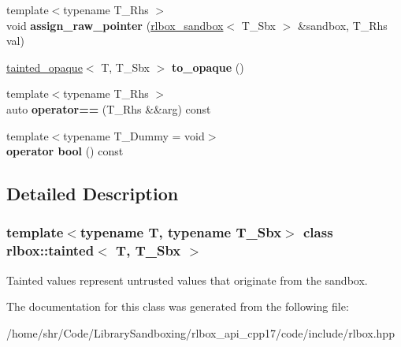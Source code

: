 \begin{DoxyCompactItemize}
\item 
\mbox{\label{classrlbox_1_1tainted_a27a59dcab0ce6e4aa69be370ce5543fc}} 
{\footnotesize template$<$typename T\+\_\+\+Rhs $>$ }\\void {\bfseries assign\+\_\+raw\+\_\+pointer} (\hyperlink{classrlbox_1_1rlbox__sandbox}{rlbox\+\_\+sandbox}$<$ T\+\_\+\+Sbx $>$ \&sandbox, T\+\_\+\+Rhs val)
\item 
\mbox{\label{classrlbox_1_1tainted_a7396dc3297186d7c10dd8bc031627a78}} 
\hyperlink{classrlbox_1_1tainted__opaque}{tainted\+\_\+opaque}$<$ T, T\+\_\+\+Sbx $>$ {\bfseries to\+\_\+opaque} ()
\item 
\mbox{\label{classrlbox_1_1tainted_a47bf953dac27d504e46682a6f33c2205}} 
{\footnotesize template$<$typename T\+\_\+\+Rhs $>$ }\\auto {\bfseries operator==} (T\+\_\+\+Rhs \&\&arg) const
\item 
\mbox{\label{classrlbox_1_1tainted_a43e697ce5c9a1b853e786cae10105a52}} 
{\footnotesize template$<$typename T\+\_\+\+Dummy  = void$>$ }\\{\bfseries operator bool} () const
\end{DoxyCompactItemize}


\subsection{Detailed Description}
\subsubsection*{template$<$typename T, typename T\+\_\+\+Sbx$>$\newline
class rlbox\+::tainted$<$ T, T\+\_\+\+Sbx $>$}

Tainted values represent untrusted values that originate from the sandbox. 

The documentation for this class was generated from the following file\+:\begin{DoxyCompactItemize}
\item 
/home/shr/\+Code/\+Library\+Sandboxing/rlbox\+\_\+api\+\_\+cpp17/code/include/rlbox.\+hpp\end{DoxyCompactItemize}
